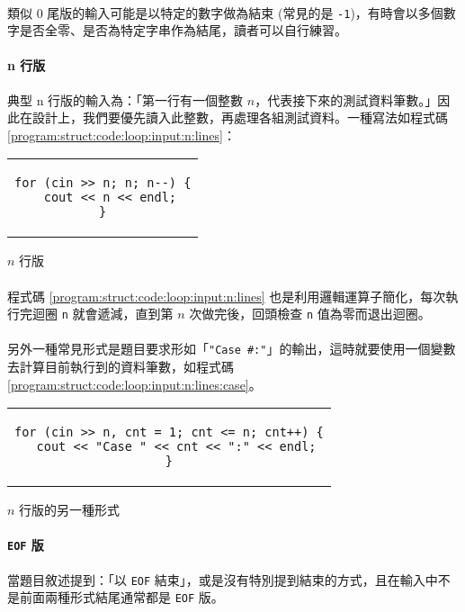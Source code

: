 \documentclass[12pt,a4paper,oneside]{report}
\begin{document}
\begin{CJK}{UTF8}{bkai}
\paragraph{}類似 0 尾版的輸入可能是以特定的數字做為結束 (常見的是 \lstinline!-1!)，有時會以多個數字是否全零、是否為特定字串作為結尾，讀者可以自行練習。

\paragraph{n 行版}典型 n 行版的輸入為：「第一行有一個整數 $n$，代表接下來的測試資料筆數。」因此在設計上，我們要優先讀入此整數，再處理各組測試資料。一種寫法如程式碼 \ref{program:struct:code:loop:input:n:lines}：

\begin{code}[h!]
\centering
\begin{tabular}{c}
\begin{lstlisting}
for (cin >> n; n; n--) {
  cout << n << endl;
}
\end{lstlisting}
\end{tabular}
\caption{$n$ 行版}
\label{program:struct:code:loop:input:n:lines}
\end{code}

\paragraph{}程式碼 \ref{program:struct:code:loop:input:n:lines} 也是利用邏輯運算子簡化，每次執行完迴圈 \lstinline!n! 就會遞減，直到第 $n$ 次做完後，回頭檢查 \lstinline!n! 值為零而退出迴圈。
\paragraph{}另外一種常見形式是題目要求形如「\lstinline!"Case #:"!」的輸出，這時就要使用一個變數去計算目前執行到的資料筆數，如程式碼 \ref{program:struct:code:loop:input:n:lines:case}。

\begin{code}[h!]
\centering
\begin{tabular}{c}
\begin{lstlisting}
for (cin >> n, cnt = 1; cnt <= n; cnt++) {
  cout << "Case " << cnt << ":" << endl;
}
\end{lstlisting}
\end{tabular}
\caption{$n$ 行版的另一種形式}
\label{program:struct:code:loop:input:n:lines:case}
\end{code}

\paragraph{\texttt{EOF} 版}當題目敘述提到：「以 \texttt{EOF} 結束」，或是沒有特別提到結束的方式，且在輸入中不是前面兩種形式結尾通常都是 \texttt{EOF} 版。

\end{CJK}
\end{document}

